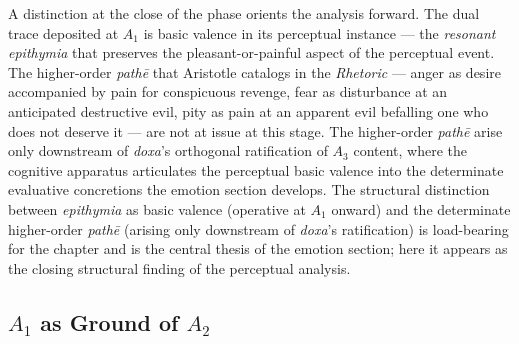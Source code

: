 A distinction at the close of the phase orients the analysis forward. The dual trace deposited at $A_1$ is basic valence in its perceptual instance --- the \textit{resonant epithymia} that preserves the pleasant-or-painful aspect of the perceptual event. The higher-order \textit{pathē} that Aristotle catalogs in the \textit{Rhetoric} --- anger as desire accompanied by pain for conspicuous revenge, fear as disturbance at an anticipated destructive evil, pity as pain at an apparent evil befalling one who does not deserve it --- are not at issue at this stage. The higher-order \textit{pathē} arise only downstream of \textit{doxa}'s orthogonal ratification of $A_3$ content, where the cognitive apparatus articulates the perceptual basic valence into the determinate evaluative concretions the emotion section develops. The structural distinction between \textit{epithymia} as basic valence (operative at $A_1$ onward) and the determinate higher-order \textit{pathē} (arising only downstream of \textit{doxa}'s ratification) is load-bearing for the chapter and is the central thesis of the emotion section; here it appears as the closing structural finding of the perceptual analysis.

\subsection{$A_1$ as Ground of $A_2$}

